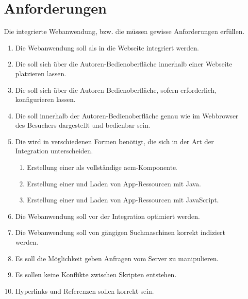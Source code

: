 \section{Anforderungen}
\label{sec:anforderungen}
Die integrierte Webanwendung, bzw. die \ajc müssen gewisse Anforderungen erfüllen.


\begin{enumerate}[label=A\arabic*:]
	
	\item Die Webanwendung soll als \ajc in die Webseite integriert werden.
	\item Die \ajc soll sich über die Autoren-Bedienoberfläche innerhalb einer Webseite platzieren lassen.
	\item Die \ajc soll sich über die Autoren-Bedienoberfläche, sofern erforderlich, konfigurieren lassen.
	\item Die \ajc soll innerhalb der Autoren-Bedienoberfläche genau wie im Webbrowser des Besuchers dargestellt und bedienbar sein.
	
	\item Die \ajc wird in verschiedenen Formen benötigt, die sich in der Art der Integration unterscheiden.
	\begin{enumerate}[label=A\arabic{enumi}.\arabic*:]
		\item Erstellung einer \ajc als vollständige \ac{aem}-Komponente.
		\item Erstellung einer \ajc und Laden von App-Ressourcen mit Java.
		\item Erstellung einer \ajc und Laden von App-Ressourcen mit JavaScript.
	\end{enumerate}

	\item Die Webanwendung soll vor der Integration optimiert werden.
	\item Die Webanwendung soll von gängigen Suchmaschinen korrekt indiziert werden.
	
	\item Es soll die Möglichkeit geben Anfragen vom Server zu manipulieren.
	\item Es sollen keine Konflikte zwischen Skripten entstehen.
	\item Hyperlinks und Referenzen sollen korrekt sein.
\end{enumerate}

